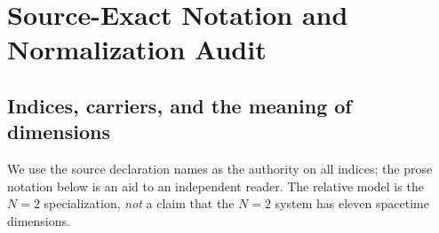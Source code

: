 \chapter{Source-Exact Notation and Normalization Audit}
\label{app:normalization}

\section{Indices, carriers, and the meaning of dimensions}

We use the source declaration names as the authority on all indices;
the prose notation below is an aid to an independent reader. The
relative model is the $N=2$ specialization, \emph{not} a claim that
the $N=2$ system has eleven spacetime dimensions.

